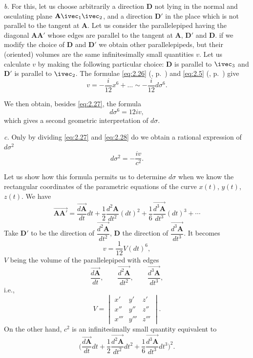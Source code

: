 \somespace

\emph{b.} For this, let us choose arbitrarily a direction $\mathbf{D}$ not lying in the normal and osculating plane $\mathbf{A}\ivec_{1}\ivec_{2}$, and a direction $\mathbf{D}'$ in the place which is not parallel to the tangent at $\mathbf{A}$. Let us consider the parallelepiped having the diagonal $\mathbf{AA}'$ whose edges are parallel to the tangent at $\mathbf{A}$, $\mathbf{D}'$ and $\mathbf{D}$. if we modify the choice of $\mathbf{D}$ and $\mathbf{D}'$ we obtain other parallelepipeds, but their (oriented) volumes are the same infinitesimally small quantities $v$. Let us calculate $v$ by making the following particular choice: $\mathbf{D}$ is parallel to $\ivec_{3}$ and $\mathbf{D}'$ is parallel to $\ivec_{2}$. The formulae \eqref{eq:2.26} (, p.~\pageref{eq:2.26}) and \eqref{eq:2.5} (, p.~\pageref{eq:2.5}) give
\[
v=-\frac{i}{12}x^{6}+\dots\sim-\frac{i}{12}d\sigma^{6}.
\]

We then obtain, besides \eqref{eq:2.27}, the formula
\begin{equation}
  \label{eq:2.28}
  d\sigma^{6}=12iv,
\end{equation}
which gives a second geometric interpretation of $d\sigma$.

\somespace

\emph{c.} Only by dividing \eqref{eq:2.27} and \eqref{eq:2.28} do we obtain a rational expression of $d\sigma^{2}$
\begin{equation}
  \label{eq:2.29}
  d\sigma^{2}=-\frac{iv}{c^{2}}.
\end{equation}

Let us show how this formula permits us to determine $d\sigma$ when we know the rectangular coordinates of the parametric equations of the curve $x(t)$, $y(t)$, $z(t)$. We have
\[
\overrightarrow{\mathbf{AA}'}=\frac{\overrightarrow{d\mathbf{A}}}{dt}dt+\frac{1}{2}\frac{d^{2}\mathbf{A}}{dt^{2}}(dt)^{2}+\frac{1}{6}\frac{\overrightarrow{d^{3}\mathbf{A}}}{dt^{3}}(dt)^{3}+\cdots
\]
Take $\mathbf{D}'$ to be the direction of $\dfrac{\overrightarrow{d^{2}\mathbf{A}}}{dt^{2}}$, $\mathbf{D}$ the direction of $\dfrac{\overrightarrow{d^{3}\mathbf{A}}}{dt^{3}}$. It becomes
\[
v=\frac{1}{12}V(dt)^{6},
\]
$V$ being the volume of the parallelepiped with edges
\[
\frac{\overrightarrow{d\mathbf{A}}}{dt},\qquad
\frac{\overrightarrow{d^{2}\mathbf{A}}}{dt^{2}},\qquad
\frac{\overrightarrow{d^{3}\mathbf{A}}}{dt^{3}},
\]
i.e.,
\[
V=
\begin{vmatrix}
  x'&y'&z'\\
  x''&y''&z''\\
  x'''&y'''&z'''
\end{vmatrix}.
\]
On the other hand, $c^{2}$ is an infinitesimally small quantity equivalent to
\[
\biggl(\frac{\overrightarrow{d\mathbf{A}}}{dt}dt+\frac{1}{2}\frac{\overrightarrow{d^{2}\mathbf{A}}}{dt^{2}}dt^{2}+\frac{1}{6}\frac{\overrightarrow{d^{3}\mathbf{A}}}{dt^{3}}dt^{3}\biggr)^{2}.
\]

